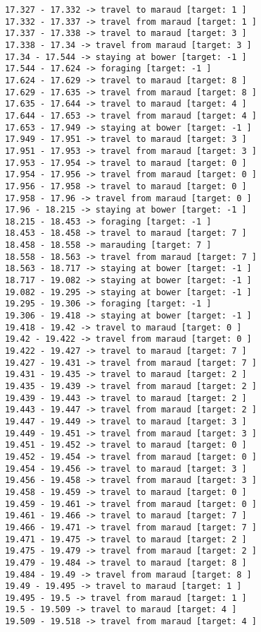 \documentclass[11pt]{article}
\begin{document}
\begin{Verbatim}[commandchars=\\\{\}]
17.327 - 17.332 -> travel to maraud [target: 1 ]
17.332 - 17.337 -> travel from maraud [target: 1 ]
17.337 - 17.338 -> travel to maraud [target: 3 ]
17.338 - 17.34 -> travel from maraud [target: 3 ]
17.34 - 17.544 -> staying at bower [target: -1 ]
17.544 - 17.624 -> foraging [target: -1 ]
17.624 - 17.629 -> travel to maraud [target: 8 ]
17.629 - 17.635 -> travel from maraud [target: 8 ]
17.635 - 17.644 -> travel to maraud [target: 4 ]
17.644 - 17.653 -> travel from maraud [target: 4 ]
17.653 - 17.949 -> staying at bower [target: -1 ]
17.949 - 17.951 -> travel to maraud [target: 3 ]
17.951 - 17.953 -> travel from maraud [target: 3 ]
17.953 - 17.954 -> travel to maraud [target: 0 ]
17.954 - 17.956 -> travel from maraud [target: 0 ]
17.956 - 17.958 -> travel to maraud [target: 0 ]
17.958 - 17.96 -> travel from maraud [target: 0 ]
17.96 - 18.215 -> staying at bower [target: -1 ]
18.215 - 18.453 -> foraging [target: -1 ]
18.453 - 18.458 -> travel to maraud [target: 7 ]
18.458 - 18.558 -> marauding [target: 7 ]
18.558 - 18.563 -> travel from maraud [target: 7 ]
18.563 - 18.717 -> staying at bower [target: -1 ]
18.717 - 19.082 -> staying at bower [target: -1 ]
19.082 - 19.295 -> staying at bower [target: -1 ]
19.295 - 19.306 -> foraging [target: -1 ]
19.306 - 19.418 -> staying at bower [target: -1 ]
19.418 - 19.42 -> travel to maraud [target: 0 ]
19.42 - 19.422 -> travel from maraud [target: 0 ]
19.422 - 19.427 -> travel to maraud [target: 7 ]
19.427 - 19.431 -> travel from maraud [target: 7 ]
19.431 - 19.435 -> travel to maraud [target: 2 ]
19.435 - 19.439 -> travel from maraud [target: 2 ]
19.439 - 19.443 -> travel to maraud [target: 2 ]
19.443 - 19.447 -> travel from maraud [target: 2 ]
19.447 - 19.449 -> travel to maraud [target: 3 ]
19.449 - 19.451 -> travel from maraud [target: 3 ]
19.451 - 19.452 -> travel to maraud [target: 0 ]
19.452 - 19.454 -> travel from maraud [target: 0 ]
19.454 - 19.456 -> travel to maraud [target: 3 ]
19.456 - 19.458 -> travel from maraud [target: 3 ]
19.458 - 19.459 -> travel to maraud [target: 0 ]
19.459 - 19.461 -> travel from maraud [target: 0 ]
19.461 - 19.466 -> travel to maraud [target: 7 ]
19.466 - 19.471 -> travel from maraud [target: 7 ]
19.471 - 19.475 -> travel to maraud [target: 2 ]
19.475 - 19.479 -> travel from maraud [target: 2 ]
19.479 - 19.484 -> travel to maraud [target: 8 ]
19.484 - 19.49 -> travel from maraud [target: 8 ]
19.49 - 19.495 -> travel to maraud [target: 1 ]
19.495 - 19.5 -> travel from maraud [target: 1 ]
19.5 - 19.509 -> travel to maraud [target: 4 ]
19.509 - 19.518 -> travel from maraud [target: 4 ]

\end{Verbatim}
\end{document}
